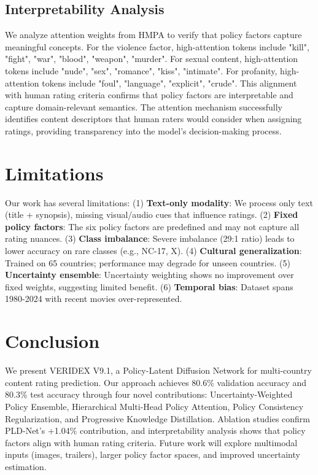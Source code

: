 \documentclass[11pt]{article}
\begin{document}
\subsection{Interpretability Analysis}

We analyze attention weights from HMPA to verify that policy factors capture meaningful concepts. For the violence factor, high-attention tokens include "kill", "fight", "war", "blood", "weapon", "murder". For sexual content, high-attention tokens include "nude", "sex", "romance", "kiss", "intimate". For profanity, high-attention tokens include "foul", "language", "explicit", "crude". This alignment with human rating criteria confirms that policy factors are interpretable and capture domain-relevant semantics. The attention mechanism successfully identifies content descriptors that human raters would consider when assigning ratings, providing transparency into the model's decision-making process.

\section{Limitations}

Our work has several limitations: (1) \textbf{Text-only modality}: We process only text (title + synopsis), missing visual/audio cues that influence ratings. (2) \textbf{Fixed policy factors}: The six policy factors are predefined and may not capture all rating nuances. (3) \textbf{Class imbalance}: Severe imbalance (29:1 ratio) leads to lower accuracy on rare classes (e.g., NC-17, X). (4) \textbf{Cultural generalization}: Trained on 65 countries; performance may degrade for unseen countries. (5) \textbf{Uncertainty ensemble}: Uncertainty weighting shows no improvement over fixed weights, suggesting limited benefit. (6) \textbf{Temporal bias}: Dataset spans 1980-2024 with recent movies over-represented.

\section{Conclusion}

We present VERIDEX V9.1, a Policy-Latent Diffusion Network for multi-country content rating prediction. Our approach achieves 80.6\% validation accuracy and 80.3\% test accuracy through four novel contributions: Uncertainty-Weighted Policy Ensemble, Hierarchical Multi-Head Policy Attention, Policy Consistency Regularization, and Progressive Knowledge Distillation. Ablation studies confirm PLD-Net's +1.04\% contribution, and interpretability analysis shows that policy factors align with human rating criteria. Future work will explore multimodal inputs (images, trailers), larger policy factor spaces, and improved uncertainty estimation.
\end{document}
